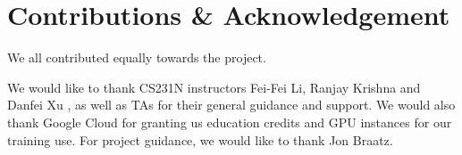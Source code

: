 \documentclass[10pt,twocolumn,letterpaper]{article}
\begin{document}




\section{Contributions \& Acknowledgement}
We all contributed equally towards the project.

    



We would like to thank CS231N instructors Fei-Fei Li, Ranjay Krishna and Danfei Xu , as well as TAs for their general guidance and support. We would also thank Google Cloud for granting us education credits and GPU instances for our training use. For project guidance, we would like to thank Jon Braatz.


{\small


}
\end{document}
